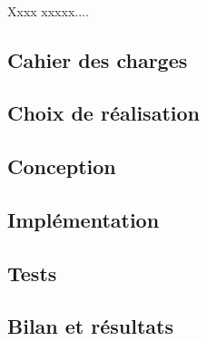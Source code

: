 \documentclass[a4paper,12pt]{report}
\begin{document}
\paragraph{}
Xxxx xxxxx....
\subsection{Cahier des charges}
\paragraph{}
\subsection{Choix de réalisation}
\paragraph{}
\subsection{Conception}
\paragraph{}
\subsection{Implémentation}
\paragraph{}
\subsection{Tests}
\paragraph{}
\subsection{Bilan et résultats}
\end{document}
